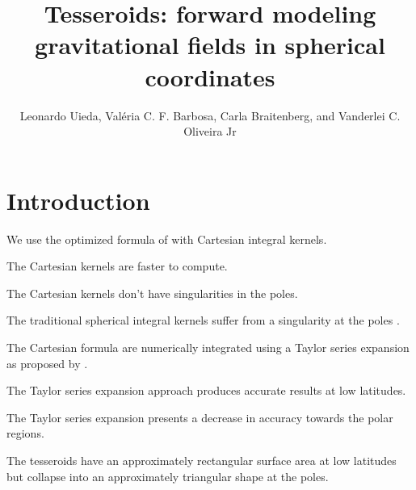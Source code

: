 \documentclass[paper,twocolumn]{geophysics}
\begin{document}
\title{
Tesseroids: forward modeling gravitational fields in spherical coordinates
}

\author{
    Leonardo Uieda\footnotemark[1]\footnotemark[2],
    Val\'eria C. F. Barbosa\footnotemark[2],
    Carla Braitenberg\footnotemark[3],
    and
    Vanderlei C. Oliveira Jr\footnotemark[2]
}

\address{
    \footnotemark[1]Universidade do Estado do Rio de Janeiro,
    Rio de Janeiro, Brazil.
    email: leouieda@gmail.com
    \\
    \footnotemark[2]Observat\'orio Nacional,
    Rio de Janeiro, Brazil.
    \\
    \footnotemark[3]Department of Mathematics and Geosciences,
    University of Trieste, Trieste, Italy.
}

\maketitle


\begin{abstract}
\end{abstract}

\section{Introduction}


We use the optimized formula of \citet{Grombein2013} with Cartesian integral
kernels.

The Cartesian kernels are faster to compute.

The Cartesian kernels don't have singularities in the poles.

The traditional spherical integral kernels suffer from a singularity at the
poles \citep{Heck2007, Wild-Pfeiffer2008}.

The Cartesian formula are numerically integrated using a Taylor series
expansion as proposed by \citet{Heck2007}.

The Taylor series expansion approach produces accurate results at low
latitudes.

The Taylor series expansion presents a decrease in accuracy towards the polar
regions.

The tesseroids have an approximately rectangular surface area at low latitudes
but collapse into an approximately triangular shape at the poles.
\end{document}

